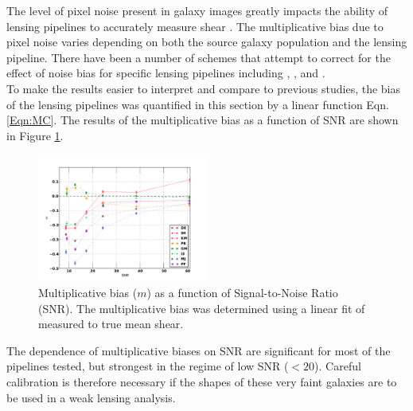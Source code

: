 
The level of pixel noise present in galaxy images
greatly impacts the ability of lensing pipelines 
to accurately measure shear \citep[e.g.][]{peter_n, Okura_n, R_n}. 
The multiplicative bias due to pixel noise varies 
depending on both the source galaxy population
and the lensing pipeline. There have been a number
of schemes that attempt to correct for the
effect of noise bias for specific lensing pipelines
including \citet{K_n}, \citet{cfhtls}, and \citet{Bernstein2014}.  \\

To make the results easier to interpret and compare to previous
studies, the bias of the lensing pipelines was quantified in this
section by a linear function Eqn. \ref{Eqn:MC}.
The results of the multiplicative bias as a function of SNR are shown in Figure \ref{fig:Snr}. 
\begin{figure}
 \centering  %
  \includegraphics[width=0.5\textwidth]{fig/MvalSNR_v2.pdf} 
  \caption{Multiplicative bias ($m$) as a function
    of Signal-to-Noise Ratio (SNR). The multiplicative bias was determined
    using a linear fit of measured to true mean shear.}
\label{fig:Snr}
\end{figure}

 The dependence of multiplicative biases on SNR are significant for most of the pipelines tested, but strongest in the regime of low SNR ($<20$). Careful calibration is therefore necessary if the shapes of these very faint galaxies are to be used in a weak lensing analysis.